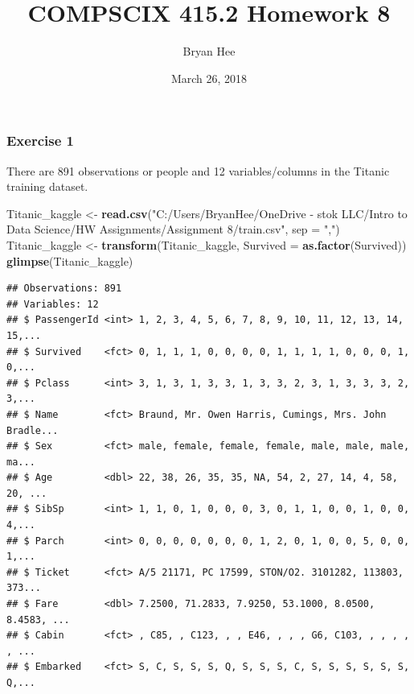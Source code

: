 \documentclass[]{article}
\title{COMPSCIX 415.2 Homework 8}
\author{Bryan Hee}
\date{March 26, 2018}
\newenvironment{Shaded}{\begin{snugshade}}{\end{snugshade}}
\newcommand{\KeywordTok}[1]{\textcolor[rgb]{0.13,0.29,0.53}{\textbf{#1}}}
\newcommand{\DataTypeTok}[1]{\textcolor[rgb]{0.13,0.29,0.53}{#1}}
\newcommand{\StringTok}[1]{\textcolor[rgb]{0.31,0.60,0.02}{#1}}
\newcommand{\OperatorTok}[1]{\textcolor[rgb]{0.81,0.36,0.00}{\textbf{#1}}}
\newcommand{\NormalTok}[1]{#1}
\begin{document}
\maketitle

\subsubsection{Exercise 1}\label{exercise-1}

There are 891 observations or people and 12 variables/columns in the
Titanic training dataset.

\begin{Shaded}
\begin{Highlighting}[]
\NormalTok{Titanic_kaggle <-}\StringTok{ }\KeywordTok{read.csv}\NormalTok{(}\StringTok{"C:/Users/BryanHee/OneDrive - stok LLC/Intro to Data Science/HW Assignments/Assignment 8/train.csv"}\NormalTok{, }\DataTypeTok{sep =} \StringTok{","}\NormalTok{)}
\NormalTok{Titanic_kaggle <-}\StringTok{ }\KeywordTok{transform}\NormalTok{(Titanic_kaggle, }\DataTypeTok{Survived =} \KeywordTok{as.factor}\NormalTok{(Survived))}
\KeywordTok{glimpse}\NormalTok{(Titanic_kaggle)}
\end{Highlighting}
\end{Shaded}

\begin{verbatim}
## Observations: 891
## Variables: 12
## $ PassengerId <int> 1, 2, 3, 4, 5, 6, 7, 8, 9, 10, 11, 12, 13, 14, 15,...
## $ Survived    <fct> 0, 1, 1, 1, 0, 0, 0, 0, 1, 1, 1, 1, 0, 0, 0, 1, 0,...
## $ Pclass      <int> 3, 1, 3, 1, 3, 3, 1, 3, 3, 2, 3, 1, 3, 3, 3, 2, 3,...
## $ Name        <fct> Braund, Mr. Owen Harris, Cumings, Mrs. John Bradle...
## $ Sex         <fct> male, female, female, female, male, male, male, ma...
## $ Age         <dbl> 22, 38, 26, 35, 35, NA, 54, 2, 27, 14, 4, 58, 20, ...
## $ SibSp       <int> 1, 1, 0, 1, 0, 0, 0, 3, 0, 1, 1, 0, 0, 1, 0, 0, 4,...
## $ Parch       <int> 0, 0, 0, 0, 0, 0, 0, 1, 2, 0, 1, 0, 0, 5, 0, 0, 1,...
## $ Ticket      <fct> A/5 21171, PC 17599, STON/O2. 3101282, 113803, 373...
## $ Fare        <dbl> 7.2500, 71.2833, 7.9250, 53.1000, 8.0500, 8.4583, ...
## $ Cabin       <fct> , C85, , C123, , , E46, , , , G6, C103, , , , , , ...
## $ Embarked    <fct> S, C, S, S, S, Q, S, S, S, C, S, S, S, S, S, S, Q,...
\end{verbatim}

\begin{Shaded}
\end{Shaded}
\end{document}

